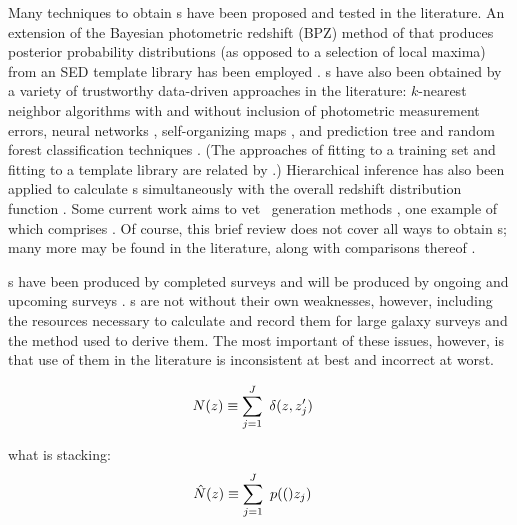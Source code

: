 Many techniques to obtain \pzpdf s have been proposed and tested in the literature.  
An extension of the Bayesian photometric redshift (BPZ) method of \citet{Benitez2000} that produces posterior probability distributions (as opposed to a selection of local maxima) from an SED template library has been employed \citep{Hildebrandt2012, Kelly2014, Lopez-Sanjuan2015}.  
\Pzpdf s have also been obtained by a variety of trustworthy data-driven approaches in the literature: $k$-nearest neighbor algorithms with \citep{Ball2008} and without \citep{Sheldon2012} inclusion of photometric measurement errors, neural networks \citep{Bonnett2015a}, self-organizing maps \citep{CarrascoKind2014a}, and prediction tree and random forest classification techniques \citep{Carliles2010, CarrascoKind2013}.  
(The approaches of fitting to a training set and fitting to a template library are related by \citet{Budavari2009}.)  
Hierarchical inference has also been applied to calculate \pzpdf s simultaneously with the overall redshift distribution function \citep{Leistedt2016}.  
Some current work aims to vet \pzpdf\ generation methods \citep{Wittman2016}, one example of which comprises .
Of course, this brief review does not cover all ways to obtain \pzpdf s; many more may be found in the literature, along with comparisons thereof \citep{Hildebrandt2010, Dahlen2013, Sanchez2013, Bonnett2015}.

\Pzpdf s have been produced by completed surveys \citep{Hildebrandt2012, Sheldon2012} and will be produced by ongoing and upcoming surveys \citep{LSSTScienceCollaboration2009, CarrascoKind2014a, Bonnett2015, Masters2015}.  
\Pzpdf s are not without their own weaknesses, however, including the resources necessary to calculate and record them for large galaxy surveys \citep{CarrascoKind2014} and the method used to derive them.  
The most important of these issues, however, is that use of them in the literature is inconsistent at best and incorrect at worst.  



\begin{align}
\eqlabel{eqn:Nz}
N(z) &\equiv \sum_{j=1}^{J}\ \delta(z, z'_{j})
\end{align}

what is stacking:
\begin{align}
\eqlabel{eqn:stacked}
\hat{N}(z) &\equiv \sum_{j=1}^{J}\ \pr(z_{j})
\end{align}
\citep{Lima2008}

